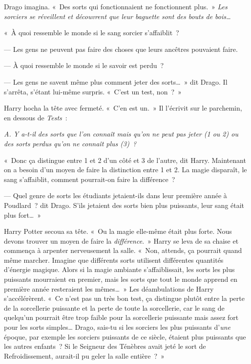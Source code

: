 Drago imagina. «~Des sorts qui fonctionnaient ne fonctionnent plus.~» \emph{Les sorciers se réveillent et découvrent que leur baguette sont des bouts de bois…}

«~À quoi ressemble le monde si le sang sorcier s'affaiblit~?

--- Les gens ne peuvent pas faire des choses que leurs ancêtres pouvaient faire.

--- À quoi ressemble le monde si le savoir est perdu~?

--- Les gens ne savent même plus comment jeter des sorts…~» dit Drago. Il s'arrêta, s'étant lui-même surpris. «~C'est un test, non~?~»

Harry hocha la tête avec fermeté. «~C'en est un.~» Il l'écrivit sur le parchemin, en dessous de \emph{Tests}~:

\emph{A. Y a-t-il des sorts que l'on connaît mais qu'on ne peut pas jeter (1 ou 2) ou des sorts perdus qu'on ne connaît plus (3)~?}

«~Donc ça distingue entre 1 et 2 d'un côté et 3 de l'autre, dit Harry. Maintenant on a besoin d'un moyen de faire la distinction entre 1 et 2. La magie disparaît, le sang s'affaiblit, comment pourrait-on faire la différence~?

--- Quel genre de sorts les étudiants jetaient-ils dans leur première année à Poudlard~? dit Drago. S'ils jetaient des sorts bien plus puissants, leur sang était plus fort…~»

Harry Potter secoua sa tête. «~Ou la magie elle-même était plus forte. Nous devons trouver un moyen de faire la \emph{différence}.~» Harry se leva de sa chaise et commença à arpenter nerveusement la salle. «~Non, attends, ça pourrait quand même marcher. Imagine que différents sorts utilisent différentes quantités d'énergie magique. Alors si la magie ambiante s'affaiblissait, les sorts les plus puissants mourraient en premier, mais les sorts que tout le monde apprend en première année resteraient les mêmes…~» Les déambulations de Harry s'accélérèrent. «~Ce n'est pas un très bon test, ça distingue plutôt entre la perte de la sorcellerie puissante et la perte de toute la sorcellerie, car le sang de quelqu'un pourrait être trop faible pour la sorcellerie puissante mais assez fort pour les sorts simples… Drago, sais-tu si les sorciers les plus puissants d'\emph{une} époque, par exemple les sorciers puissants de ce siècle, étaient plus puissants que les autres enfants~? Si le Seigneur des Ténèbres avait jeté le sort de Refroidissement, aurait-il pu geler la salle entière~?~»

